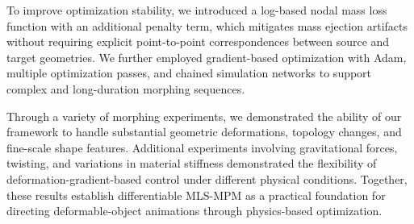     To improve optimization stability, we introduced a log-based nodal mass loss function with an additional penalty term,
    which mitigates mass ejection artifacts without requiring explicit point-to-point correspondences between source and
    target geometries. We further employed gradient-based optimization with Adam, multiple optimization passes, and
    chained simulation networks to support complex and long-duration morphing sequences.
    
    Through a variety of morphing experiments, we demonstrated the ability of our framework to handle substantial geometric
    deformations, topology changes, and fine-scale shape features. Additional experiments involving gravitational forces,
    twisting, and variations in material stiffness demonstrated the flexibility of deformation-gradient-based control under
    different physical conditions. Together, these results establish differentiable MLS-MPM as a practical foundation
    for directing deformable-object animations through physics-based optimization.
    